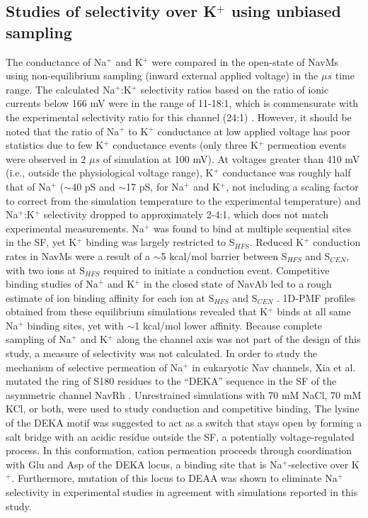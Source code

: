 \begin{refsection}
 \subsection{Studies of selectivity over K$^{+}$ using unbiased sampling}
 The conductance of Na$^{+}$ and K$^{+}$ were compared in the open-state of NavMs using non-equilibrium sampling (inward external applied voltage) in the $\mu s$ time range.  The calculated Na$^{+}$:K$^{+}$ selectivity ratios based on the ratio of ionic currents below 166 mV were in the range of 11-18:1, which is commensurate with the experimental selectivity ratio for this channel (24:1) \cite{Ulmschneider:2013da}.  However, it should be noted that the ratio of Na$^{+}$ to K$^{+}$ conductance at low applied voltage has poor statistics due to few K$^{+}$ conductance events (only three K$^{+}$ permeation events were observed in 2 $\mu s$ of simulation at 100 mV).  At voltages greater than 410 mV (i.e., outside the physiological voltage range), K$^{+}$ conductance was roughly half that of Na$^{+}$ ($\sim$40 pS and $\sim$17 pS, for Na$^{+}$ and K$^{+}$, not including a scaling factor to correct from the simulation temperature to the experimental temperature) and Na$^{+}$:K$^{+}$ selectivity dropped to approximately 2-4:1, which does not match experimental measurements.  Na$^{+}$ was found to bind at multiple sequential sites in the SF, yet K$^{+}$ binding was largely restricted to S$_{HFS}$.  Reduced K$^{+}$ conduction rates in NavMs were a result of a $\sim$5 kcal/mol barrier between S$_{HFS}$ and S$_{CEN}$, with two ions at S$_{HFS}$ required to initiate a conduction event. 
Competitive binding studies of Na$^{+}$ and K$^{+}$ in the closed state of NavAb led to a rough estimate of ion binding affinity for each ion at S$_{HFS}$ and S$_{CEN}$ \cite{Boiteux:2014ut}.  1D-PMF profiles obtained from these equilibrium simulations revealed that K$^{+}$ binds at all same Na$^{+}$ binding sites, yet with $\sim$1 kcal/mol lower affinity.  Because complete sampling of Na$^{+}$ and K$^{+}$ along the channel axis was not part of the design of this study, a measure of selectivity was not calculated.
In order to study the mechanism of selective permeation of Na$^{+}$ in eukaryotic Nav channels, Xia et al. \cite{Xia:2013dv} mutated the ring of S180 residues to the ``DEKA'' sequence in the SF of the asymmetric channel NavRh \cite{Zhang:2013bz}.  Unrestrained simulations with 70 mM NaCl, 70 mM KCl, or both, were used to study conduction and competitive binding.  The lysine of the DEKA motif was suggested to act as a switch that stays open by forming a salt bridge with an acidic residue outside the SF, a potentially voltage-regulated process.  In this conformation, cation permeation proceeds through coordination with Glu and Asp of the DEKA locus, a binding site that is Na$^{+}$-selective over K$^{+}$.  Furthermore, mutation of this locus to DEAA was shown to eliminate Na$^{+}$ selectivity in experimental studies \cite{Favre:1996dg} in agreement with simulations reported in this study.
 

\end{refsection}
